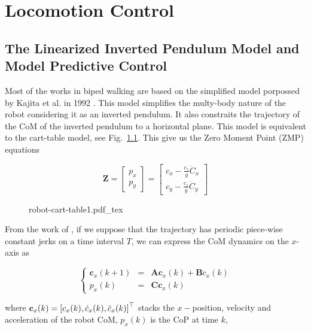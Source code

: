 
\chapter{Locomotion Control} 
\label{Chap:Locomotion-Control}

\section{The Linearized Inverted Pendulum Model and Model Predictive Control}
Most of the works in biped walking are based on the simplified model porpossed by Kajita et al. in 1992 \citep{Kajita1992}. This model simplifies the multy-body nature of the robot considering it as an inverted pendulum. It also constraits the trajectory of the CoM of the inverted pendulum to a horizontal plane. This model is equivalent to the cart-table model, see Fig.~\ref{Fig:Inverted-Pendulum-Cart-Table}. This give us the Zero Moment Point (ZMP) \citep{Vukobratovi1972,Vukobratovi2004} equations

\begin{equation}
\mathbf{Z} = 
\left[
\begin{matrix}
p_x \\ p_y
\end{matrix}
\right] = 
\left[
\begin{matrix}
c_x - \frac{c_z}{g}\ddot{C}_x \\ c_y - \frac{c_z}{g}\ddot{C}_y
\end{matrix}
\right]
\end{equation}

\begin{figure}
  \centering
      {\def\svgwidth{0.5\columnwidth}
        
                   {robot-cart-table1.pdf_tex}}
      \caption[]{}
      \label{Fig:Inverted-Pendulum-Cart-Table}
\end{figure}

From the  work of \citep{Kajita2003}, if we suppose that the trajectory has periodic piece-wise constant jerks on a time interval $T$, we can express the CoM dynamics on the $x$-axis as

$$
\left\{
\begin{array}{ccc}
 {\mathbf c}_x(k+1) &=& {\mathbf A} {\mathbf c}_x(k) + {\mathbf B} \dddot{c}_x(k)\\
 p_x(k) &=& {\mathbf C} {\mathbf c}_x(k)
\end{array}
\right.
$$

where ${\mathbf c}_x(k) = \left[ c_x(k), \dot{c}_x(k), \ddot{c}_x(k) \right]^{\top}$ stacks the $x-$position, velocity and acceleration of the robot CoM, $p_x(k)$ is the CoP at time $k$,


